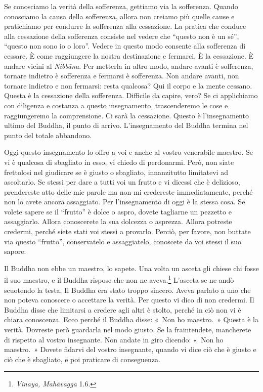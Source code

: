 Se conosciamo la verità della sofferenza, gettiamo via la sofferenza.
Quando conosciamo la causa della sofferenza, allora non creiamo più
quelle cause e pratichiamo per condurre la sofferenza alla cessazione.
La pratica che conduce alla cessazione della sofferenza consiste nel
vedere che ``questo non è un sé'', ``questo non sono io o loro''. Vedere
in questo modo consente alla sofferenza di cessare. È come raggiungere
la nostra destinazione e fermarci. È la cessazione. È andare vicini al
\emph{Nibbāna}. Per metterla in altro modo, andare avanti è sofferenza,
tornare indietro è sofferenza e fermarsi è sofferenza. Non andare
avanti, non tornare indietro e non fermarsi: resta qualcosa? Qui il
corpo e la mente cessano. Questa è la cessazione della sofferenza.
Difficile da capire, vero? Se ci applichiamo con diligenza e costanza a
questo insegnamento, trascenderemo le cose e raggiungeremo la
comprensione. Ci sarà la cessazione. Questo è l'insegnamento ultimo del
Buddha, il punto di arrivo. L'insegnamento del Buddha termina nel punto
del totale abbandono.

Oggi questo insegnamento lo offro a voi e anche al vostro venerabile
maestro. Se vi è qualcosa di sbagliato in esso, vi chiedo di perdonarmi.
Però, non siate frettolosi nel giudicare se è giusto o sbagliato,
innanzitutto limitatevi ad ascoltarlo. Se stessi per dare a tutti voi un
frutto e vi dicessi che è delizioso, prendereste atto delle mie parole
ma non mi credereste immediatamente, perché non lo avete ancora
assaggiato. Per l'insegnamento di oggi è la stessa cosa. Se volete
sapere se il ``frutto'' è dolce o aspro, dovete tagliarne un pezzetto e
assaggiarlo. Allora conoscerete la sua dolcezza o asprezza. Allora
potreste credermi, perché siete stati voi stessi a provarlo. Perciò, per
favore, non buttate via questo ``frutto'', conservatelo e assaggiatelo,
conoscete da voi stessi il suo sapore.

Il Buddha non ebbe un maestro, lo sapete. Una volta un asceta gli chiese
chi fosse il suo maestro, e il Buddha rispose che non ne
aveva.\footnote{\emph{Vinaya, Mahāvagga} 1.6.} L'asceta se ne andò
scuotendo la testa. Il Buddha era stato troppo sincero. Aveva parlato a
uno che non poteva conoscere o accettare la verità. Per questo vi dico
di non credermi. Il Buddha disse che limitarsi a credere agli altri è
stolto, perché in ciò non vi è chiara conoscenza. Ecco perché il Buddha
disse: «~Non ho maestro.~» Questa è la verità. Dovreste però guardarla
nel modo giusto. Se la fraintendete, mancherete di rispetto al vostro
insegnante. Non andate in giro dicendo: «~Non ho maestro.~» Dovete
fidarvi del vostro insegnante, quando vi dice ciò che è giusto e ciò che
è sbagliato, e poi praticare di conseguenza.

